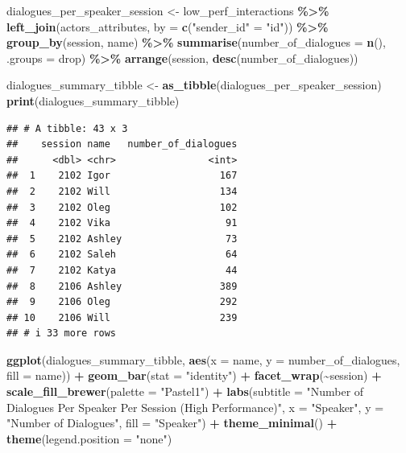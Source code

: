 \documentclass[
]{article}
\newenvironment{Shaded}{\begin{snugshade}}{\end{snugshade}}
\newcommand{\AttributeTok}[1]{\textcolor[rgb]{0.13,0.29,0.53}{#1}}
\newcommand{\FunctionTok}[1]{\textcolor[rgb]{0.13,0.29,0.53}{\textbf{#1}}}
\newcommand{\NormalTok}[1]{#1}
\newcommand{\OtherTok}[1]{\textcolor[rgb]{0.56,0.35,0.01}{#1}}
\newcommand{\SpecialCharTok}[1]{\textcolor[rgb]{0.81,0.36,0.00}{\textbf{#1}}}
\newcommand{\StringTok}[1]{\textcolor[rgb]{0.31,0.60,0.02}{#1}}
\begin{document}
\begin{Shaded}
\begin{Highlighting}[]
\NormalTok{dialogues\_per\_speaker\_session }\OtherTok{\textless{}{-}}\NormalTok{ low\_perf\_interactions }\SpecialCharTok{\%\textgreater{}\%}
  \FunctionTok{left\_join}\NormalTok{(actors\_attributes, }\AttributeTok{by =} \FunctionTok{c}\NormalTok{(}\StringTok{"sender\_id"} \OtherTok{=} \StringTok{"id"}\NormalTok{)) }\SpecialCharTok{\%\textgreater{}\%}
  \FunctionTok{group\_by}\NormalTok{(session, name) }\SpecialCharTok{\%\textgreater{}\%}
  \FunctionTok{summarise}\NormalTok{(}\AttributeTok{number\_of\_dialogues =} \FunctionTok{n}\NormalTok{(), }\AttributeTok{.groups =} \StringTok{\textquotesingle{}drop\textquotesingle{}}\NormalTok{) }\SpecialCharTok{\%\textgreater{}\%}
  \FunctionTok{arrange}\NormalTok{(session, }\FunctionTok{desc}\NormalTok{(number\_of\_dialogues))}

\NormalTok{dialogues\_summary\_tibble }\OtherTok{\textless{}{-}} \FunctionTok{as\_tibble}\NormalTok{(dialogues\_per\_speaker\_session)}
\FunctionTok{print}\NormalTok{(dialogues\_summary\_tibble)}
\end{Highlighting}
\end{Shaded}

\begin{verbatim}
## # A tibble: 43 x 3
##    session name   number_of_dialogues
##      <dbl> <chr>                <int>
##  1    2102 Igor                   167
##  2    2102 Will                   134
##  3    2102 Oleg                   102
##  4    2102 Vika                    91
##  5    2102 Ashley                  73
##  6    2102 Saleh                   64
##  7    2102 Katya                   44
##  8    2106 Ashley                 389
##  9    2106 Oleg                   292
## 10    2106 Will                   239
## # i 33 more rows
\end{verbatim}

\begin{Shaded}
\begin{Highlighting}[]
\FunctionTok{ggplot}\NormalTok{(dialogues\_summary\_tibble, }\FunctionTok{aes}\NormalTok{(}\AttributeTok{x =}\NormalTok{ name, }\AttributeTok{y =}\NormalTok{ number\_of\_dialogues, }\AttributeTok{fill =}\NormalTok{ name)) }\SpecialCharTok{+} 
  \FunctionTok{geom\_bar}\NormalTok{(}\AttributeTok{stat =} \StringTok{"identity"}\NormalTok{) }\SpecialCharTok{+}
  \FunctionTok{facet\_wrap}\NormalTok{(}\SpecialCharTok{\textasciitilde{}}\NormalTok{session) }\SpecialCharTok{+}
  \FunctionTok{scale\_fill\_brewer}\NormalTok{(}\AttributeTok{palette =} \StringTok{"Pastel1"}\NormalTok{) }\SpecialCharTok{+}  
  \FunctionTok{labs}\NormalTok{(}\AttributeTok{subtitle =} \StringTok{"Number of Dialogues Per Speaker Per Session (High Performance)"}\NormalTok{,}
       \AttributeTok{x =} \StringTok{"Speaker"}\NormalTok{,}
       \AttributeTok{y =} \StringTok{"Number of Dialogues"}\NormalTok{,}
       \AttributeTok{fill =} \StringTok{"Speaker"}\NormalTok{) }\SpecialCharTok{+}
  \FunctionTok{theme\_minimal}\NormalTok{() }\SpecialCharTok{+} 
  \FunctionTok{theme}\NormalTok{(}\AttributeTok{legend.position =} \StringTok{"none"}\NormalTok{) }
\end{Highlighting}
\end{Shaded}
\end{document}
